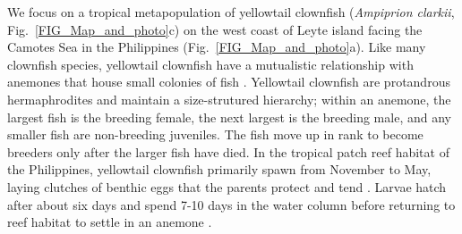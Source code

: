 \documentclass[12pt, oneside]{article}   	%
\begin{document}
We focus on a tropical metapopulation of yellowtail clownfish (\textit{Ampiprion clarkii}, Fig.\ \ref{FIG_Map_and_photo}c) on the west coast of Leyte island facing the Camotes Sea in the Philippines (Fig.\ \ref{FIG_Map_and_photo}a). Like many clownfish species, yellowtail clownfish have a mutualistic relationship with anemones that house small colonies of fish \citep{buston2003social, fautin1992field}. Yellowtail clownfish are protandrous hermaphrodites and maintain a size-strutured hierarchy; within an anemone, the largest fish is the breeding female, the next largest is the breeding male, and any smaller fish are non-breeding juveniles. The fish move up in rank to become breeders only after the larger fish have died. In the tropical patch reef habitat of the Philippines, yellowtail clownfish primarily spawn from November to May, laying clutches of benthic eggs that the parents protect and tend \citep{ochi1989mating, holtswarth2017fecundity}. Larvae hatch after about six days and spend 7-10 days in the water column before returning to reef habitat to settle in an anemone \citep{fautin1992field}.

\end{document}
